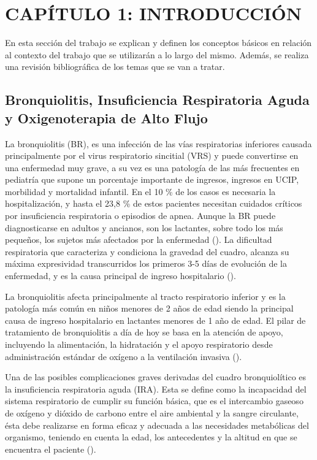 \section{CAPÍTULO 1: INTRODUCCIÓN}\label{sec:introduction}

En esta sección del trabajo se explican y definen los conceptos básicos en relación al contexto del trabajo que se utilizarán a lo largo del mismo. Además, se realiza una revisión bibliográfica de los temas que se van a tratar.

\subsection{Bronquiolitis, Insuficiencia Respiratoria Aguda y Oxigenoterapia de Alto Flujo}

La bronquiolitis (BR), es una infección de las vías respiratorias inferiores causada principalmente por el virus respiratorio sincitial (VRS) y puede convertirse en una enfermedad muy grave, a su vez es una patología de las más frecuentes en pediatría que supone un porcentaje importante de ingresos, ingresos en UCIP, morbilidad y mortalidad infantil. En el 10 \% de los casos es necesaria la hospitalización, y hasta el 23,8 \% de estos pacientes necesitan cuidados críticos por insuficiencia respiratoria o episodios de apnea. Aunque la BR puede diagnosticarse en adultos y ancianos, son los lactantes, sobre todo los más pequeños, los sujetos más afectados por la enfermedad (\cite{Fainardi2021}). La dificultad respiratoria que caracteriza y condiciona la gravedad del cuadro, alcanza su máxima expresividad transcurridos los primeros 3-5 días de evolución de la enfermedad, y es la causa principal de ingreso hospitalario (\cite{Patel2003}).

La bronquiolitis afecta principalmente al tracto respiratorio inferior y es la patología más común en niños menores de 2 años de edad siendo la principal causa de ingreso hospitalario en lactantes menores de 1 año de edad. El pilar de tratamiento de bronquiolitis a día de hoy se basa en la atención de apoyo, incluyendo la alimentación, la hidratación y el apoyo respiratorio desde administración estándar de oxígeno a la ventilación invasiva (\cite{Daverio2019}).

Una de las posibles complicaciones graves derivadas del cuadro bronquiolítico es la insuficiencia respiratoria aguda (IRA). Esta se define como la incapacidad del sistema respiratorio de cumplir su función básica, que es el intercambio gaseoso de oxígeno y dióxido de carbono entre el aire ambiental y la sangre circulante, ésta debe realizarse en forma eficaz y adecuada a las necesidades metabólicas del organismo, teniendo en cuenta la edad, los antecedentes y la altitud en que se encuentra el paciente (\cite{FernandoR2010}). 

